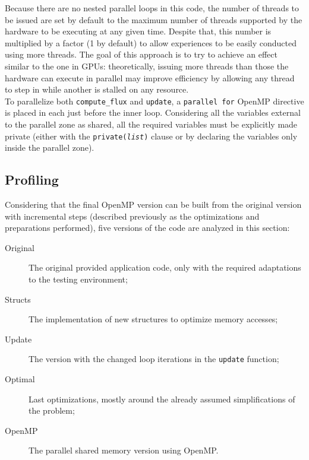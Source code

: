 \documentclass[9pt,twocolumn]{scrartcl}
\begin{document}
Because there are no nested parallel loops in this code, the number of threads to be issued are set by default to the maximum number of threads supported by the hardware to be executing at any given time. Despite that, this number is multiplied by a factor (1 by default) to allow experiences to be easily conducted using more threads. The goal of this approach is to try to achieve an effect similar to the one in GPUs: theoretically, issuing more threads than those the hardware can execute in parallel may improve efficiency by allowing any thread to step in while another is stalled on any resource.\\

To parallelize both \texttt{compute\_flux} and \texttt{update}, a \texttt{parallel for} OpenMP directive is placed in each just before the inner loop. Considering all the variables external to the parallel zone as shared, all the required variables must be explicitly made private (either with the \texttt{private({\textit{list}})} clause or by declaring the variables only inside the parallel zone).\\

\subsection{Profiling}
Considering that the final OpenMP version can be built from the original version with incremental steps (described previously as the optimizations and preparations performed), five versions of the code are analyzed in this section:
\begin{description}
\item[Original]{The original provided application code, only with the required adaptations to the testing environment;}
\item[Structs]{The implementation of new structures to optimize memory accesses;}
\item[Update]{The version with the changed loop iterations in the \texttt{update} function;}
\item[Optimal]{Last optimizations, mostly around the already assumed simplifications of the problem;}
\item[OpenMP]{The parallel shared memory version using OpenMP.}
\end{description}
\end{document}
